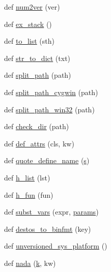 \begin{DoxyCompactItemize}
\item 
def \hyperlink{namespacewaflib_1_1_utils_a18633c8155ce7c6bb9069810180554e9}{num2ver} (ver)
\item 
def \hyperlink{namespacewaflib_1_1_utils_ad05a0a58c9d618c414f4bb8031af8554}{ex\+\_\+stack} ()
\item 
def \hyperlink{namespacewaflib_1_1_utils_ac7225ebfc537755c9bc4c59e571dabac}{to\+\_\+list} (sth)
\item 
def \hyperlink{namespacewaflib_1_1_utils_a8b8fbf885d8a703285f5ad23698dc288}{str\+\_\+to\+\_\+dict} (txt)
\item 
def \hyperlink{namespacewaflib_1_1_utils_af8f22d8c94f643274d83d9e499b7b6fb}{split\+\_\+path} (path)
\item 
def \hyperlink{namespacewaflib_1_1_utils_acc4e10c273d8d6cb32cc0cbdd8e9882f}{split\+\_\+path\+\_\+cygwin} (path)
\item 
def \hyperlink{namespacewaflib_1_1_utils_a9e33bebc9a981fe1167f2baf6a668867}{split\+\_\+path\+\_\+win32} (path)
\item 
def \hyperlink{namespacewaflib_1_1_utils_a7371a28757bf958283282cc340bd3983}{check\+\_\+dir} (path)
\item 
def \hyperlink{namespacewaflib_1_1_utils_a1bad8c8b483664adbcb626d613889765}{def\+\_\+attrs} (cls, kw)
\item 
def \hyperlink{namespacewaflib_1_1_utils_a03c8a270ecb9309553fd1cadbc95c1d3}{quote\+\_\+define\+\_\+name} (\hyperlink{lib_2expat_8h_a755339d27872b13735c2cab829e47157}{s})
\item 
def \hyperlink{namespacewaflib_1_1_utils_ab3bfd24c87f933a7abd202473853d794}{h\+\_\+list} (lst)
\item 
def \hyperlink{namespacewaflib_1_1_utils_a166c5b8b989396bc542f21c68051f72e}{h\+\_\+fun} (fun)
\item 
def \hyperlink{namespacewaflib_1_1_utils_a4a2954f3765db0e5e3f035082267c6a8}{subst\+\_\+vars} (expr, \hyperlink{_reverb_8cpp_aacc5617877d2aa4d17c729c1c8ba4eec}{params})
\item 
def \hyperlink{namespacewaflib_1_1_utils_a1bce2a571cc984820dc1707f20e9284a}{destos\+\_\+to\+\_\+binfmt} (key)
\item 
def \hyperlink{namespacewaflib_1_1_utils_a28133bb5f262617cb53203566b622507}{unversioned\+\_\+sys\+\_\+platform} ()
\item 
def \hyperlink{namespacewaflib_1_1_utils_a6696789f3197d4d7ce28251c6fbb7339}{nada} (\hyperlink{rfft2d_test_m_l_8m_adc468c70fb574ebd07287b38d0d0676d}{k}, kw)
\item 

\end{DoxyCompactItemize}
